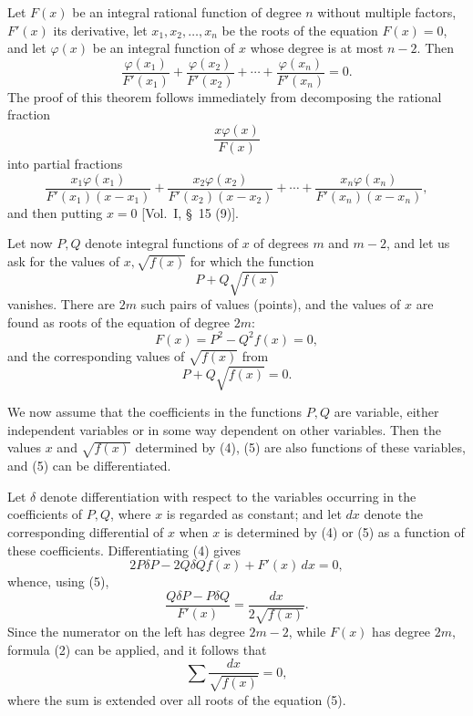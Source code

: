 \documentclass[11pt]{article}
\begin{document}
Let $F(x)$ be an integral rational function of degree $n$ without multiple factors, $F'(x)$ its derivative, let $x_1,x_2,\ldots,x_n$ be the roots of the equation $F(x)=0$, and let $\varphi(x)$ be an integral function of $x$ whose degree is at most $n-2$. Then
\begin{equation}
\frac{\varphi(x_1)}{F'(x_1)}
+\frac{\varphi(x_2)}{F'(x_2)}
+\cdots+
\frac{\varphi(x_n)}{F'(x_n)}=0.
\tag{2}
\end{equation}
The proof of this theorem follows immediately from decomposing the rational fraction
\[
\frac{x\varphi(x)}{F(x)}
\]
into partial fractions
\[
\frac{x_1\varphi(x_1)}{F'(x_1)(x-x_1)}
+\frac{x_2\varphi(x_2)}{F'(x_2)(x-x_2)}
+\cdots+
\frac{x_n\varphi(x_n)}{F'(x_n)(x-x_n)},
\]
and then putting $x=0$ [Vol.~I, \S~15 (9)].

Let now $P,Q$ denote integral functions of $x$ of degrees $m$ and $m-2$, and let us ask for the values of $x,\sqrt{f(x)}$ for which the function
\begin{equation}
P+Q\sqrt{f(x)}
\tag{3}
\end{equation}
vanishes. There are $2m$ such pairs of values (points), and the values of $x$ are found as roots of the equation of degree $2m$:
\begin{equation}
F(x)=P^2-Q^2f(x)=0,
\tag{4}
\end{equation}
and the corresponding values of $\sqrt{f(x)}$ from
\begin{equation}
P+Q\sqrt{f(x)}=0.
\tag{5}
\end{equation}

We now assume that the coefficients in the functions $P,Q$ are variable, either independent variables or in some way dependent on other variables. Then the values $x$ and $\sqrt{f(x)}$ determined by (4), (5) are also functions of these variables, and (5) can be differentiated.

Let $\delta$ denote differentiation with respect to the variables occurring in the coefficients of $P,Q$, where $x$ is regarded as constant; and let $dx$ denote the corresponding differential of $x$ when $x$ is determined by (4) or (5) as a function of these coefficients. Differentiating (4) gives
\[
2P\delta P-2Q\delta Q f(x)+F'(x)\,dx=0,
\]
whence, using (5),
\begin{equation}
\frac{Q\delta P-P\delta Q}{F'(x)}
=
\frac{dx}{2\sqrt{f(x)}}.
\tag{6}
\end{equation}
Since the numerator on the left has degree $2m-2$, while $F(x)$ has degree $2m$, formula (2) can be applied, and it follows that
\begin{equation}
\sum \frac{dx}{\sqrt{f(x)}}=0,
\tag{7}
\end{equation}
where the sum is extended over all roots of the equation (5).
\end{document}
